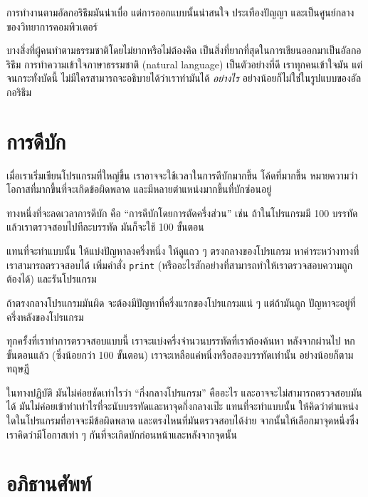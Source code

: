 การทำงานตามอัลกอริธึมมันน่าเบื่อ แต่การออกแบบนั้นน่าสนใจ ประเทืองปัญญา 
และเป็นศูนย์กลางของวิทยาการคอมพิวเตอร์

บางสิ่งที่ผู้คนทำตามธรรมชาติโดยไม่ยากหรือไม่ต้องคิด 
เป็นสิ่งที่ยากที่สุดในการเขียนออกมาเป็นอัลกอริธึม การทำความเข้าใจภาษาธรรมชาติ (natural language) เป็นตัวอย่างที่ดี
เราทุกคนเข้าใจมัน แต่จนกระทั่งบัดนี้ ไม่มีใครสามารถจะอธิบายได้ว่าเราทำมันได้ {\em อย่างไร}
อย่างน้อยก็ไม่ใช่ในรูปแบบของอัลกอริธึม


\section{การดีบัก}
\label{bisectbug}

เมื่อเราเริ่มเขียนโปรแกรมที่ใหญ่ขึ้น เราอาจจะใช้เวลาในการดีบักมากขึ้น โค้ดที่มากขึ้น 
หมายความว่า โอกาสที่มากขึ้นที่จะเกิดข้อผิดพลาด 
และมีหลายตำแหน่งมากขึ้นที่บักซ่อนอยู่

ทางหนึ่งที่จะลดเวลาการดีบัก คือ ``การดีบักโดยการตัดครึ่งส่วน'' เช่น ถ้าในโปรแกรมมี
100 บรรทัด แล้วเราตรวจสอบไปทีละบรรทัด มันก็จะใช้ 100 ขั้นตอน

แทนที่จะทำแบบนั้น ให้แบ่งปัญหาลงครึ่งหนึ่ง ให้ดูแถว ๆ ตรงกลางของโปรแกรม 
หาค่าระหว่างทางที่เราสามารถตรวจสอบได้ เพิ่มคำสั่ง {\tt print}  
(หรืออะไรสักอย่างที่สามารถทำให้เราตรวจสอบความถูกต้องได้) และรันโปรแกรม

ถ้าตรงกลางโปรแกรมมันผิด จะต้องมีปัญหาที่ครึ่งแรกของโปรแกรมแน่ ๆ แต่ถ้ามันถูก 
ปัญหาจะอยู่ที่ครึ่งหลังของโปรแกรม

ทุกครั้งที่เราทำการตรวจสอบแบบนี้ เราจะแบ่งครึ่งจำนวนบรรทัดที่เราต้องค้นหา หลังจากผ่านไป
หกขั้นตอนแล้ว (ซึ่งน้อยกว่า 100 ขั้นตอน) เราจะเหลือแค่หนึ่งหรือสองบรรทัดเท่านั้น 
อย่างน้อยก็ตามทฤษฎี 

ในทางปฏิบัติ มันไม่ค่อยชัดเท่าไรว่า ``กึ่งกลางโปรแกรม'' คืออะไร 
และอาจจะไม่สามารถตรวจสอบมันได้ มันไม่ค่อยเข้าท่าเท่าไรที่จะนับบรรทัดและหาจุดกึ่งกลางเป๊ะ 
แทนที่จะทำแบบนั้น ให้คิดว่าตำแหน่งใดในโปรแกรมที่อาจจะมีข้อผิดพลาด 
และตรงไหนที่มันตรวจสอบได้ง่าย 
จากนั้นให้เลือกมาจุดหนึ่งซึ่งเราคิดว่ามีโอกาสเท่า ๆ กันที่จะเกิดบักก่อนหน้าและหลังจากจุดนั้น


\section{อภิธานศัพท์}

